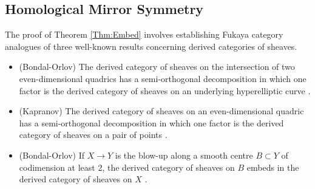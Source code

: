 \documentclass[reqno,10pt]{amsart}
\numberwithin{equation}{section}
\theoremstyle{remark}
\begin{document}
\subsection{Homological Mirror Symmetry}\label{Sec:HMS}

The proof of Theorem \ref{Thm:Embed} involves establishing Fukaya category analogues of three well-known results concerning derived categories of sheaves.

\begin{itemize}
\item (Bondal-Orlov) The derived category of sheaves on the intersection of two even-dimensional quadrics has a semi-orthogonal decomposition  in which one factor is the  derived category of sheaves on an underlying hyperelliptic curve \cite{BondalOrlov}.
\item (Kapranov) The derived category of sheaves on an even-dimensional quadric has a semi-orthogonal decomposition in which one factor is the derived category of sheaves on a pair of points \cite{Kapranov}.
\item (Bondal-Orlov) If $X \rightarrow Y$ is the blow-up along a smooth centre $B\subset Y$ of codimension at least 2, the derived category of sheaves on $B$ embeds in the derived category of sheaves on $X$ \cite{BondalOrlov}.
\end{itemize}
\end{document}

